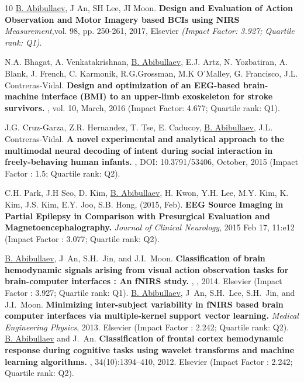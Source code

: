 \documentclass[10pt,letterpaper,sans]{moderncv}   %
\begin{document}
\begin{thebibliography}{10}
    \small 
    \underline{B. Abibullaev}, J An, SH Lee, JI Moon.
    \newblock \textbf{Design and Evaluation of Action Observation and Motor Imagery based {BCIs} using {NIRS}} \newblock \textit{Measurement},vol. 98, pp. 250-261, 2017, Elsevier \textit{(Impact Factor: 3.927; Quartile rank: Q1)}.
    
    \small
    N.A. Bhagat, A. Venkatakrishnan, \underline{B. Abibullaev}, E.J. Artz, N. Yozbatiran, A. Blank, J. French, C. Karmonik, R.G.Grossman, M.K O'Malley, G. Francisco, J.L. Contreras-Vidal.
    \newblock \textbf{Design and optimization of an {EEG}-based brain-machine interface (BMI) to an upper-limb exoskeleton for stroke survivors.}
    , vol. 10, March, 2016 (Impact Factor: 4.677; Quartile rank: Q1).
    
    \small
    J.G. Cruz-Garza, Z.R. Hernandez, T. Tse, E. Caducoy, \underline{B. Abibullaev}, J.L. Contreras-Vidal.
    \newblock \textbf{A novel experimental and analytical approach to the multimodal neural decoding of intent during social interaction in freely-behaving human infants.}
    , DOI: 10.3791/53406, October, 2015 (Impact Factor : 1.5; Quartile rank: Q2).
    
    \small
    C.H. Park, J.H Seo, D. Kim, \underline{B. Abibullaev}, H. Kwon, Y.H. Lee, M.Y. Kim, K. Kim, J.S. Kim, E.Y. Joo, S.B. Hong, (2015, Feb). 
    \newblock \textbf{{EEG} Source Imaging in Partial Epilepsy in Comparison with Presurgical Evaluation and Magnetoencephalography.}
    {\em Journal of Clinical Neurology}, 2015 Feb 17, 11:e12 (Impact Factor : 3.077; Quartile rank: Q2).
    
    \underline{B. Abibullaev}, J~An, S.H.~Jin, and J.I.~Moon.
    \newblock \textbf{Classification of brain hemodynamic signals arising from
    visual action observation tasks for brain-computer interfaces : An {fNIRS} study. }, , 2014. Elsevier (Impact Factor : 3.927; Quartile rank: Q1).
    \underline{B. Abibullaev}, J~An, S.H.~Lee, S.H.~Jin, and J.I.~Moon.
    \newblock \textbf{Minimizing inter-subject variability in {fNIRS} based brain computer interfaces via multiple-kernel support vector learning.}
     {\em Medical Engineering Physics}, 2013. Elsevier (Impact Factor : 2.242; Quartile rank: Q2).
    \underline{B. Abibullaev} and J.~An.
    \newblock \textbf{Classification of frontal cortex hemodynamic response during cognitive tasks using wavelet transforms and machine learning algorithms.}
    , 34(10):1394--410, 2012. Elsevier (Impact Factor : 2.242; Quartile rank: Q2).
    

\end{thebibliography}
\end{document}
